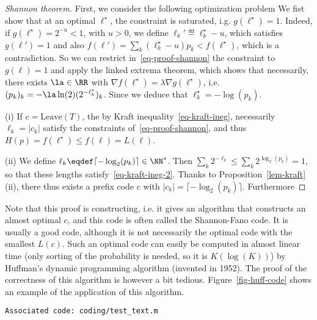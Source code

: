 \begin{proof}[Shannon theorem]
	First, we consider the following optimization problem
	We fist show that at an optimal $\ell^\star$, the constraint is saturated, i.g. $g(\ell^\star)=1$. Indeed, if $g(\ell^\star)=2^{-u} < 1$, with $u>0$, we define $\ell_k' \eqdef \ell_k^\star-u$, which satisfies $g(\ell') = 1$ and also $f(\ell')=\sum_k (\ell_k^\star-u) p_k < f(\ell^\star)$, which is a contradiction.
	So we can restrict in~\eqref{eq-proof-shannon} the constraint to $g(\ell)=1$ and apply the linked extrema theorem, which shows that necessarily, there exists $\la \in \RR$ with $\nabla f(\ell^\star)=\lambda \nabla g(\ell^\star)$, i.e.  $(p_k)_k = -\la \ln(2) (2^{-\ell_k^\star})_k$. Since 
	we deduce that $\ell^\star_k = -\log(p_k)$. 
	
	(i) If $c=\text{Leave}(T)$, the by Kraft inequality~\eqref{eq-kraft-ineg}, necessarily $\ell_k=|c_k|$ satisfy the constraints of~\eqref{eq-proof-shannon}, and thus $H(p) = f(\ell^\star) \leq f(\ell) = L(\ell)$.
	
	(ii) We define $\ell_k \eqdef \lceil -\log_2(p_k) \rceil \in \NN^*$. Then $\sum_k 2^{-\ell_k} \leq \sum_k 2^{\log_2(p_k)} = 1$, so that these lengths satisfy~\eqref{eq-kraft-ineg-2}. Thanks to Proposition~\ref{lem-kraft} (ii), there thus exists a prefix code $c$ with $|c_k|=\lceil -\log_2(p_k) \rceil$. Furthermore
\end{proof}

Note that this proof is constructing, i.e. it gives an algorithm that constructs an almost optimal $c$, and this code is often called the Shannon-Fano code. It is usually a good code, although it is not necessarily the optimal code with the smallest $L(c)$. Such an optimal code can easily be computed in almost linear time (only sorting of the probability is needed, so it is $K(\log(K))$) by Huffman's dynamic programming algorithm (invented in 1952). The proof of the correctness of this algorithm is however a bit tedious. Figure~\ref{fig-huff-code} shows an example of the application of this algorithm.


\texttt{Associated code: coding/test\_text.m}


